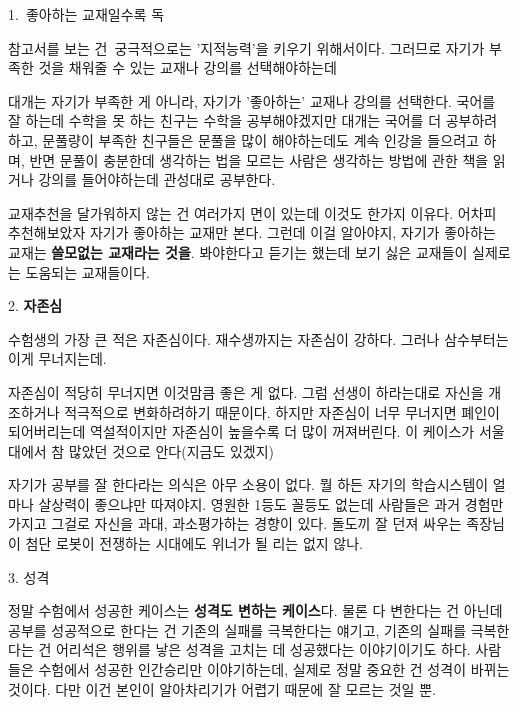 \item 1. 좋아하는 교재일수록 독
\vspace{5mm}

참고서를 보는 건 궁극적으로는 '지적능력'을 키우기 위해서이다.
그러므로 자기가 부족한 것을 채워줄 수 있는 교재나 강의를 선택해야하는데
\vspace{5mm}

대개는 자기가 부족한 게 아니라, 자기가 '좋아하는' 교재나 강의를 선택한다.
국어를 잘 하는데 수학을 못 하는 친구는 수학을 공부해야겠지만 대개는 국어를 더 공부하려 하고,
문풀량이 부족한 친구들은 문풀을 많이 해야하는데도 계속 인강을 들으려고 하며,
반면 문풀이 충분한데 생각하는 법을 모르는 사람은 생각하는 방법에 관한 책을 읽거나 강의를 들어야하는데 관성대로 공부한다.
\vspace{5mm}

교재추천을 달가워하지 않는 건 여러가지 면이 있는데 이것도 한가지 이유다.
어차피 추천해보았자 자기가 좋아하는 교재만 본다. 그런데 이걸 알아야지, 자기가 좋아하는 교재는 \textbf{쓸모없는 교재라는 것을}.
봐야한다고 듣기는 했는데 보기 싫은 교재들이 실제로는 도움되는 교재들이다.
\vspace{5mm}

\item 2. \textbf{자존심}
\vspace{5mm}

수험생의 가장 큰 적은 자존심이다.
재수생까지는 자존심이 강하다. 그러나 삼수부터는 이게 무너지는데.
\vspace{5mm}

자존심이 적당히 무너지면 이것맘큼 좋은 게 없다. 그럼 선생이 하라는대로 자신을 개조하거나 적극적으로 변화하려하기 때문이다.
하지만 자존심이 너무 무너지면 폐인이 되어버리는데 역설적이지만 자존심이 높을수록 더 많이 꺼져버린다.
이 케이스가 서울대에서 참 많았던 것으로 안다(지금도 있겠지)
\vspace{5mm}

자기가 공부를 잘 한다라는 의식은 아무 소용이 없다. 뭘 하든 자기의 학습시스템이 얼마나 살상력이 좋으냐만 따져야지.
영원한 1등도 꼴등도 없는데 사람들은 과거 경험만 가지고 그걸로 자신을 과대, 과소평가하는 경향이 있다.
돌도끼 잘 던져 싸우는 족장님이 첨단 로봇이 전쟁하는 시대에도 위너가 될 리는 없지 않나.
\vspace{5mm}

\item 3. 성격
\vspace{5mm}

정말 수험에서 성공한 케이스는 \textbf{성격도 변하는 케이스}다.
물론 다 변한다는 건 아닌데 공부를 성공적으로 한다는 건 기존의 실패를 극복한다는 얘기고,
기존의 실패를 극복한다는 건 어리석은 행위를 낳은 성격을 고치는 데 성공했다는 이야기이기도 하다.
사람들은 수험에서 성공한 인간승리만 이야기하는데, 실제로 정말 중요한 건 성격이 바뀌는 것이다.
다만 이건 본인이 알아차리기가 어렵기 때문에 잘 모르는 것일 뿐.
\vspace{5mm}

